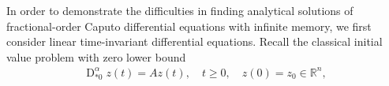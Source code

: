 \documentclass{svproc}
\newcommand{\realnumbers}{\mathbb{R}}
\newcommand{\AstderivativeInput}[2]{\operatorname{D}_{\ast #2}^{#1}}
\begin{document}
 In order to demonstrate the difficulties in finding analytical solutions of fractio\-nal-order Caputo differential equations with infinite memory, we first consider linear time-invariant differential equations. Recall the classical initial value problem with zero lower bound \cite{Diethelm2010}
\begin{align}\label{eq_CaputoDE_ZeroLowerBound}
{\AstderivativeInput{\alpha}{0}} z (t) = Az(t),\quad t\geq 0,\quad	z(0) = z_0 \in \realnumbers^n,
\end{align}
\end{document}
